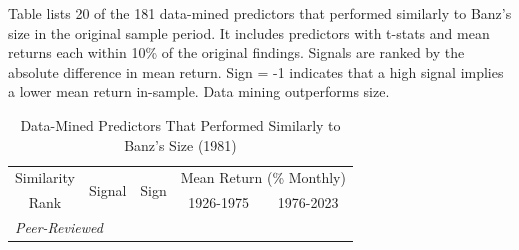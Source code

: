 \begin{table}[p]
  \caption{Data-Mined Predictors That Performed Similarly to Banz's Size (1981)}
    \label{tab:closer_size}
    
    \begin{singlespace}
    \noindent Table lists 20 of the 181 data-mined predictors that performed similarly to Banz's \citeyearpar{banz1981relationship} size in the original sample period. It includes predictors with t-stats and mean returns each within 10\% of the original findings. Signals are ranked by the absolute difference in mean return. Sign = -1 indicates that a high signal implies a lower mean return in-sample. Data mining outperforms  size.
    \end{singlespace}
    \begin{centering}
    \vspace{-1ex}
    \par\end{centering}
    \centering{}\setlength{\tabcolsep}{1.0ex} \footnotesize
    \begin{center}
    \begin{tabular}{rlrrr} \toprule 
    \multicolumn{1}{c}{Similarity} 
        & \multirow{2}[2]{*}{Signal} 
        & \multicolumn{1}{l}{\multirow{2}[2]{*}{Sign}} & \multicolumn{2}{c}{Mean Return (\% Monthly)} \\   
    \multicolumn{1}{c}{Rank} 
        &  &  & \multicolumn{1}{c}{1926-1975} & \multicolumn{1}{c}{1976-2023} \\ \midrule \multicolumn{5}{l}{\textit{Peer-Reviewed}} \\ \midrule   
    
    \bottomrule \end{tabular}%
    \end{center} 
\end{table}

\clearpage{}
\newpage{}
